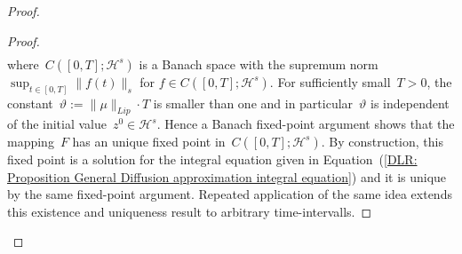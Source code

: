 \begin{proof}
\begin{proof}
\begin{align*}
    \end{align*}
    where~$C([0,T];\mathcal{H}^s)$ is a Banach space with the supremum norm~$\sup_{t \in [0,T]} \| f(t) \|_s $ for $f \in C([0,T];\mathcal{H}^s)$. For sufficiently small~$T>0$, the constant~$\vartheta := \| \mu \|_{Lip} \cdot T$ is smaller than one and in particular~$\vartheta $ is independent of the initial value~$z^0 \in \mathcal{H}^s$. Hence a Banach fixed-point argument shows that the mapping~$F$ has an unique fixed point in~$C([0,T];\mathcal{H}^s)$. By construction, this fixed point is a solution for the integral equation given in Equation~(\ref{DLR: Proposition General Diffusion approximation integral equation}) and it is unique by the same fixed-point argument. Repeated application of the same idea extends this existence and uniqueness result to arbitrary time-intervalls. 
    

\end{proof}
\end{proof}
